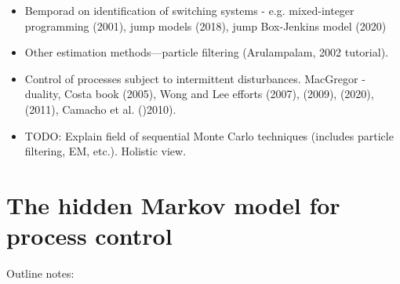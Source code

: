 \begin{itemize}
	\item Bemporad on identification of switching systems - e.g. mixed-integer programming (2001), jump models (2018), jump Box-Jenkins model (2020)
	\item Other estimation methods—particle filtering (Arulampalam, 2002 tutorial).
	\item Control of processes subject to intermittent disturbances. MacGregor - duality, Costa book (2005), Wong and Lee efforts (2007), (2009), (2020), (2011), Camacho et al. ()2010).
	\item TODO: Explain field of sequential Monte Carlo techniques (includes particle filtering, EM, etc.).  Holistic view.
\end{itemize}

\section*{The hidden Markov model for process control}
\label{hmm_control}

Outline notes:


